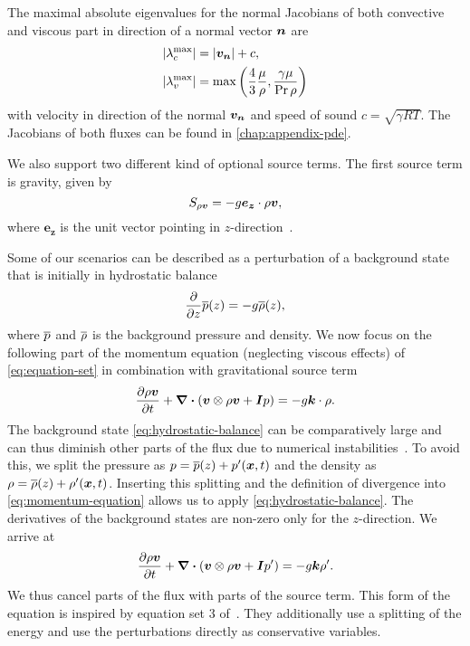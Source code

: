 The maximal absolute eigenvalues for the normal Jacobians of both convective and viscous part in direction of a normal vector $\bm{n}$ are
\begin{align}
  \begin{split}
    \maxConvEigen &=  \vert \Qv_{\normal} \vert + c,\\
    \maxViscEigen &= \max \left( \frac{4}{3} \frac{\mu}{\Qrho},
                        \frac{\gamma \mu}{\Pr \Qrho}\right)
  \end{split}
\end{align}
with velocity in direction of the normal $\bm{v}_{\bm{n}}$ and speed of sound $c = \sqrt{\gamma R T }$.
The Jacobians of both fluxes can be found in \cref{chap:appendix-pde}.

We also support two different kind of optional source terms.
The first source term is gravity, given by
\begin{equation}\label{eq:source-gravity}
  \source[\Qj] = - g \bm{e_z} \cdot \Qj,
\end{equation}
where $\bm{e_z}$ is the unit vector pointing in $z$-direction~\cite{giraldo2008study}.

\newcommand{\backgroundPressure}{\overline{\pressure}}
\newcommand{\backgroundRho}{\overline{\Qrho}}
Some of our scenarios can be described as a perturbation of a background state that is initially in hydrostatic balance
\begin{equation}
  \label{eq:hydrostatic-balance}
  \pdv{}{z} \backgroundPressure{\left (z \right )} = -g \backgroundRho(z),
\end{equation}
where $\backgroundPressure$ and $\backgroundRho$ is the background pressure and density.
We now focus on the following part of the momentum equation (neglecting viscous effects) of \cref{eq:equation-set} in combination with gravitational source term~
\begin{equation}
  \label{eq:momentum-equation}
  \pdv{\Qj}{t}+ \divergence{ \left(
    \Qv \otimes \Qj + \bm{I} \pressure
    \right)
  }
  =
  -g \bm{k} \cdot \Qrho.
\end{equation}
The background state \cref{eq:hydrostatic-balance} can be comparatively large and can thus diminish other parts of the flux due to numerical instabilities~\cite{muller2010adaptive}.
To avoid this, we split the pressure as $\pressure = \backgroundPressure(z) + \pressure' (\bm{x}, t)$ and the density as $\Qrho = \backgroundRho(z) + \Qrho'(\bm{x}, t)$.
Inserting this splitting and the definition of divergence into \cref{eq:momentum-equation} allows us to apply \cref{eq:hydrostatic-balance}.
The derivatives of the background states are non-zero only for the $z$-direction.
We arrive at 
\begin{equation}
  \label{eq:momentum-equation-split}
  \pdv{\Qj}{t}+ \divergence{ \left(
    \Qv \otimes \Qj + \bm{I} \pressure'
    \right)
  }
  =
  -g \bm{k} \Qrho'.
\end{equation}
We thus cancel parts of the flux with parts of the source term.
This form of the equation is inspired by equation set 3 of~\cite{giraldo2008study}.
They additionally use a splitting of the energy and use the perturbations directly as conservative variables.

